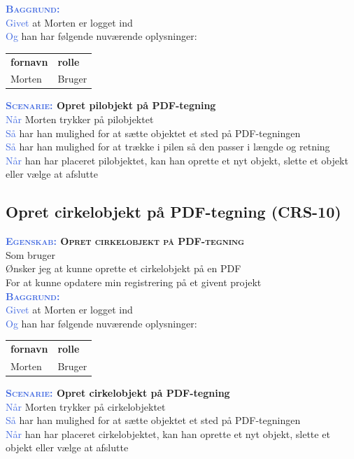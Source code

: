 \textsc{\textcolor{RoyalBlue}{\textbf{Baggrund:}}}\\
\textcolor{RoyalBlue}{Givet} at Morten er logget ind\\
\textcolor{RoyalBlue}{Og} han har følgende nuværende oplysninger:\\
\begin{tabular}{| l | l |}
	\textbf{fornavn} & \textbf{rolle} \\
	Morten & Bruger\\
\end{tabular}

\textbf{\textsc{\textcolor{RoyalBlue}{Scenarie:}} Opret pilobjekt på PDF-tegning}\\
\textcolor{RoyalBlue}{Når} Morten trykker på pilobjektet\\
\textcolor{RoyalBlue}{Så}  har han mulighed for at sætte objektet et sted på PDF-tegningen\\
\textcolor{RoyalBlue}{Så}  har han mulighed for at trække i pilen så den passer i længde og retning\\
\textcolor{RoyalBlue}{Når} han har placeret pilobjektet, kan han oprette et nyt objekt, slette et objekt eller vælge at afslutte \\

\subsection{Opret cirkelobjekt på PDF-tegning (CRS-10)} \label{sec:USOpretCirkelObjekt}
\textbf{\textsc{\textcolor{RoyalBlue}{Egenskab:} Opret cirkelobjekt på PDF-tegning}}\\
Som bruger\\
Ønsker jeg at kunne oprette et cirkelobjekt på en PDF\\
For at kunne opdatere min registrering på et givent projekt \\

\textsc{\textcolor{RoyalBlue}{\textbf{Baggrund:}}}\\
\textcolor{RoyalBlue}{Givet} at Morten er logget ind\\
\textcolor{RoyalBlue}{Og} han har følgende nuværende oplysninger:\\
\begin{tabular}{| l | l |}
	\textbf{fornavn} & \textbf{rolle} \\
	Morten & Bruger\\
\end{tabular}

\textbf{\textsc{\textcolor{RoyalBlue}{Scenarie:}} Opret cirkelobjekt på PDF-tegning}\\
\textcolor{RoyalBlue}{Når} Morten trykker på cirkelobjektet\\
\textcolor{RoyalBlue}{Så}  har han mulighed for at sætte objektet et sted på PDF-tegningen\\
\textcolor{RoyalBlue}{Når} han har placeret cirkelobjektet, kan han oprette et nyt objekt, slette et objekt eller vælge at afslutte \\

